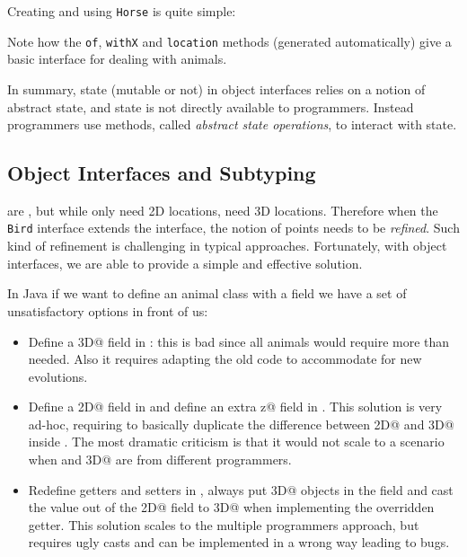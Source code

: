 
\noindent Creating and using \texttt{Horse} is quite simple:


\noindent Note how the \texttt{of}, \texttt{withX} and
\texttt{location} methods (generated automatically) give a
basic interface for dealing with animals.

In summary, state (mutable or not) in object interfaces
relies on a notion of abstract state, and state is not directly
available to programmers. Instead programmers use methods, called
\emph{abstract state operations}, to interact with state.


\subsection{Object Interfaces and Subtyping}
\Q@Bird@s are \Q@Animal@s, but while \Q@Animal@s only need 2D
locations, \Q@Bird@s need 3D locations. Therefore when the \texttt{Bird}
interface extends the \Q@Animal@ interface, the notion of points needs to
be \emph{refined}. Such kind of refinement is challenging
in typical \classbased approaches. Fortunately, with object interfaces,
we are able to provide a simple and effective solution.

In Java if we want to define an animal class with a field we have a set of
unsatisfactory options in front of us:
\begin{itemize}
\item Define a \Q@Point3D@ field in \Q@Animal@: this is bad since all animals
  would require more than needed.
  Also it requires adapting the old code to accommodate for new evolutions.

\item Define a \Q@Point2D@ field in \Q@Animal@ and define an extra \Q@int z@
  field in \Q@Bird@.  This solution is very ad-hoc, requiring to basically
  duplicate the difference between \Q@Point2D@ and \Q@Point3D@ inside \Q@Bird@.
  The most dramatic criticism is that it would not scale to a scenario when
  \Q@Bird@ and \Q@Point3D@ are from different programmers.

\item Redefine getters and setters in \Q@Bird@, always put \Q@Point3D@ objects
  in the field and cast the value out of the \Q@Point2D@ field to \Q@Point3D@
  when implementing the overridden getter.  This solution scales to the multiple
  programmers approach, but requires ugly casts and can be implemented in a
  wrong way leading to bugs.
\end{itemize}

